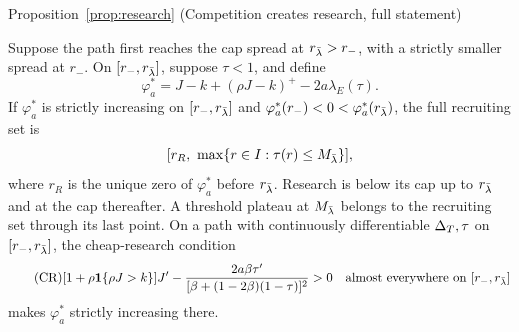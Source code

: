 \begin{named}{Proposition~\ref{prop:research} (Competition creates research, full statement)}
\begin{enumerate}[label=(\alph*),leftmargin=2em]
Suppose the path first reaches the cap spread at \(r_{\bar\lambda}>r_-\), with a strictly smaller spread at \(r_-\).
On \([r_-,r_{\bar\lambda}]\), suppose \(\tau<1\), and define
\[
 \varphi_a^*=J-k+(\rho J-k)^+-2a\lambda_E(\tau).
\]
If \(\varphi_a^*\) is strictly increasing on \([r_-,r_{\bar\lambda}]\) and
\(\varphi_a^*(r_-)<0<\varphi_a^*(r_{\bar\lambda})\), the full recruiting set is
\[
 [r_R,\ \max\{r\in I:\tau(r)\le M_{\lb}\}],
\]
where \(r_R\) is the unique zero of \(\varphi_a^*\) before \(r_{\bar\lambda}\).
Research is below its cap up to \(r_{\bar\lambda}\) and at the cap thereafter. A threshold plateau at \(M_{\bar\lambda}\) belongs
to the recruiting set through its last point.
On a path with continuously differentiable \(\Delta_T,\tau\) on \([r_-,r_{\bar\lambda}]\), the cheap-research condition
{\renewcommand{\theHequation}{A.CR}%
\begin{equation}\tag{CR}\label{eq:a5-cheap}
 [1+\rho\mathbf{1}\{\rho J>k\}]J'
 -\frac{2a\beta\tau'}{[\beta+(1-2\beta)(1-\tau)]^2}>0
 \quad\text{almost everywhere on }[r_-,r_{\bar\lambda}]
\end{equation}}%
makes \(\varphi_a^*\) strictly increasing there.
\end{enumerate}
\end{named}

